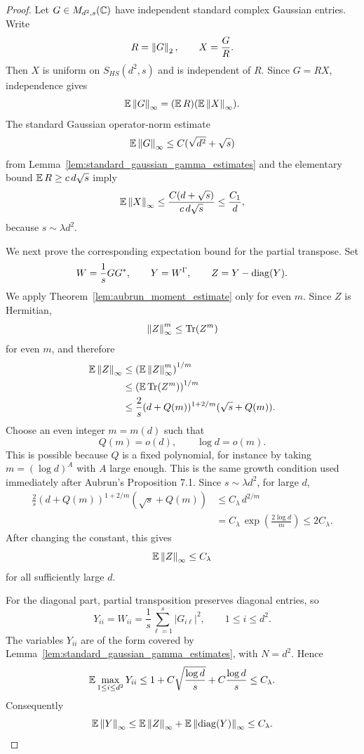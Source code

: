 \begin{proof}
Let \(G\in M_{d^2,s}(\mathbb{C})\) have independent standard complex Gaussian entries.
Write
\[
    R=\left\lVert G\right\rVert_2,\qquad X=\frac{G}{R}.
\]
Then \(X\) is uniform on \(S_{HS}(d^2,s)\) and is independent of \(R\).  Since
\(G=RX\), independence gives
\[
    \operatorname{\mathbb{E}}\left\lVert G\right\rVert_\infty=(\operatorname{\mathbb{E}} R)(\operatorname{\mathbb{E}}\left\lVert X\right\rVert_\infty).
\]
The standard Gaussian operator-norm estimate
\[
    \operatorname{\mathbb{E}}\left\lVert G\right\rVert_\infty\le C(\sqrt{d^2}+\sqrt{s})
\]
from Lemma~\ref{lem:standard_gaussian_gamma_estimates}
and the elementary bound \(\operatorname{\mathbb{E}} R\ge c\,d\sqrt{s}\) imply
\[
    \operatorname{\mathbb{E}}\left\lVert X\right\rVert_\infty
    \le
    \frac{C(d+\sqrt{s})}{c\,d\sqrt{s}}
    \le \frac{C_1}{d},
\]
because \(s\sim\lambda d^2\).

We next prove the corresponding expectation bound for the partial transpose.
Set
\[
    W=\frac1s GG^*,\qquad Y=W^\Gamma,
    \qquad Z=Y-\operatorname{diag}(Y).
\]
We apply Theorem~\ref{lem:aubrun_moment_estimate} only for even \(m\).  Since
\(Z\) is Hermitian,
\[
    \left\lVert Z\right\rVert_\infty^m\le \operatorname{Tr}(Z^m)
\]
for even \(m\), and therefore
\[
\begin{aligned}
    \operatorname{\mathbb{E}}\left\lVert Z\right\rVert_\infty
    &\le \left(\operatorname{\mathbb{E}}\left\lVert Z\right\rVert_\infty^m\right)^{1/m}              \\
    &\le \left(\operatorname{\mathbb{E}}\operatorname{Tr}(Z^m)\right)^{1/m}                       \\
    &\le
    \frac2s (d+Q(m))^{1+2/m}(\sqrt{s}+Q(m)).
\end{aligned}
\]
Choose an even integer \(m=m(d)\) such that
\[
    Q(m)=o(d),\qquad \log d=o(m).
\]
This is possible because \(Q\) is a fixed polynomial, for instance by taking
\(m=(\log d)^A\) with \(A\) large enough.  This is the same growth condition
used immediately after Aubrun's Proposition 7.1.  Since \(s\sim\lambda d^2\),
for large \(d\),
\[
\begin{aligned}
    \frac2s (d+Q(m))^{1+2/m}(\sqrt{s}+Q(m))
    &\le
    C_\lambda\, d^{2/m}                                      \\
    &=
    C_\lambda\, \exp\!\left(\frac{2\log d}{m}\right)
    \le 2C_\lambda.
\end{aligned}
\]
After changing the constant, this gives
\[
    \operatorname{\mathbb{E}}\left\lVert Z\right\rVert_\infty\le C_\lambda
\]
for all sufficiently large \(d\).

For the diagonal part, partial transposition preserves diagonal entries, so
\[
    Y_{ii}=W_{ii}=\frac1s\sum_{\ell=1}^{s}|G_{i\ell}|^2,
    \qquad 1\le i\le d^2.
\]
The variables \(Y_{ii}\) are of the form covered by
Lemma~\ref{lem:standard_gaussian_gamma_estimates}, with \(N=d^2\).  Hence
\[
    \operatorname{\mathbb{E}}\max_{1\le i\le d^2}Y_{ii}
    \le
    1+C\sqrt{\frac{\log d}{s}}+C\frac{\log d}{s}
    \le C_\lambda.
\]
Consequently
\[
    \operatorname{\mathbb{E}}\left\lVert Y\right\rVert_\infty
    \le
    \operatorname{\mathbb{E}}\left\lVert Z\right\rVert_\infty+\operatorname{\mathbb{E}}\left\lVert\operatorname{diag}(Y)\right\rVert_\infty
    \le C_\lambda.
\]


\end{proof}
